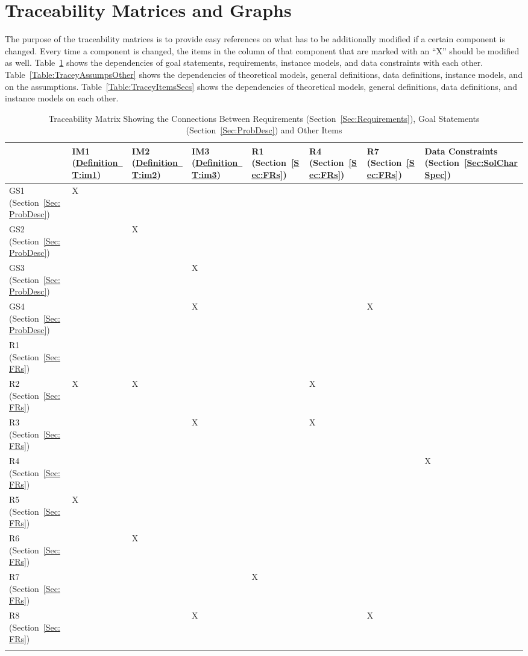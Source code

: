 \documentclass[12pt]{article}
\begin{document}
\section{Traceability Matrices and Graphs}
\label{Sec:TraceMatrices}
The purpose of the traceability matrices is to provide easy references on what has to be additionally modified if a certain component is changed. Every time a component is changed, the items in the column of that component that are marked with an ``X'' should be modified as well. Table~\ref{Table:TraceyReqGoalsOther} shows the dependencies of goal statements, requirements, instance models, and data constraints with each other. Table~\ref{Table:TraceyAssumpsOther} shows the dependencies of theoretical models, general definitions, data definitions, instance models, and on the assumptions. Table~\ref{Table:TraceyItemsSecs} shows the dependencies of theoretical models, general definitions, data definitions, and instance models on each other.
\begin{longtable}{l l l l l l l l}
\toprule
 & IM1 (\hyperref[T:im1]{Definition~T:im1}) & IM2 (\hyperref[T:im2]{Definition~T:im2}) & IM3 (\hyperref[T:im3]{Definition~T:im3}) & R1 (Section~\ref{Sec:FRs}) & R4 (Section~\ref{Sec:FRs}) & R7 (Section~\ref{Sec:FRs}) & Data Constraints (Section~\ref{Sec:SolCharSpec})
\\
\midrule
GS1 (Section~\ref{Sec:ProbDesc}) & X &  &  &  &  &  & 
\\
GS2 (Section~\ref{Sec:ProbDesc}) &  & X &  &  &  &  & 
\\
GS3 (Section~\ref{Sec:ProbDesc}) &  &  & X &  &  &  & 
\\
GS4 (Section~\ref{Sec:ProbDesc}) &  &  & X &  &  & X & 
\\
R1 (Section~\ref{Sec:FRs}) &  &  &  &  &  &  & 
\\
R2 (Section~\ref{Sec:FRs}) & X & X &  &  & X &  & 
\\
R3 (Section~\ref{Sec:FRs}) &  &  & X &  & X &  & 
\\
R4 (Section~\ref{Sec:FRs}) &  &  &  &  &  &  & X
\\
R5 (Section~\ref{Sec:FRs}) & X &  &  &  &  &  & 
\\
R6 (Section~\ref{Sec:FRs}) &  & X &  &  &  &  & 
\\
R7 (Section~\ref{Sec:FRs}) &  &  &  & X &  &  & 
\\
R8 (Section~\ref{Sec:FRs}) &  &  & X &  &  & X & 
\\
\bottomrule
\caption{Traceability Matrix Showing the Connections Between Requirements (Section~\ref{Sec:Requirements}), Goal Statements (Section~\ref{Sec:ProbDesc}) and Other Items}
\label{Table:TraceyReqGoalsOther}
\end{longtable}
\end{document}
